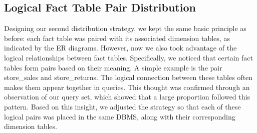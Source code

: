 \documentclass[conference]{IEEEtran}
\begin{document}
\subsection{Logical Fact Table Pair Distribution}

Designing our second distribution strategy, we kept the same basic principle as before: each fact table was paired with its associated dimension tables, as indicated by the ER diagrams. However, now we also took advantage of the logical relationships between fact tables. Specifically, we noticed that certain fact tables form pairs based on their meaning. A simple example is the pair store\_sales and store\_returns. The logical connection between these tables often makes them appear together in queries. This thought was confirmed through an observation of our query set, which showed that a large proportion followed this pattern. Based on this insight, we adjusted the strategy so that each of these logical pairs was placed in the same DBMS, along with their corresponding dimension tables.
\end{document}
